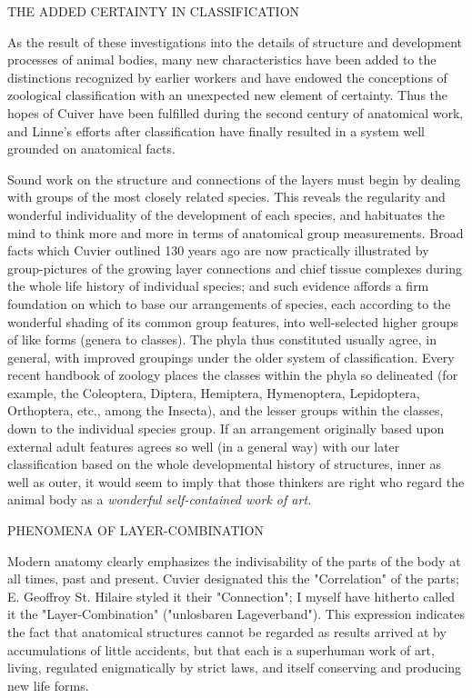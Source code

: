 THE ADDED CERTAINTY IN CLASSIFICATION

As the result of these investigations into the details of structure and development processes of
animal bodies, many new characteristics have been added to the distinctions recognized by
earlier workers and have endowed the conceptions of zoological classification with an
unexpected new element of certainty. Thus the hopes of Cuiver have been fulfilled during the
second century of anatomical work, and Linne's efforts after classification have finally
resulted in a system well grounded on anatomical facts.

Sound work on the structure and connections of the layers must begin by dealing with groups
of the most closely related species. This reveals the regularity and wonderful individuality of
the development of each species, and habituates the mind to think more and more in terms of
anatomical group measurements. Broad facts which Cuvier outlined 130 years ago are now
practically illustrated by group-pictures of the growing layer connections and chief tissue
complexes during the whole life history of individual species; and such evidence affords a
firm foundation on which to base our arrangements of species, each according to the
wonderful shading of its common group features, into well-selected higher groups of like
forms (genera to classes). The phyla thus constituted usually agree, in general, with improved
groupings under the older system of classification. Every recent handbook of zoology places
the classes within the phyla so delineated (for example, the Coleoptera, Diptera, Hemiptera,
Hymenoptera, Lepidoptera, Orthoptera, etc., among the Insecta), and the lesser groups within
the classes, down to the individual species group. If an arrangement originally based upon
external adult features agrees so well (in a general way) with our later classification based on
the whole developmental history of structures, inner as well as outer, it would seem to imply
that those thinkers are right who regard the animal body as a \textit{wonderful self-contained work
of art.}

PHENOMENA OF LAYER-COMBINATION

Modern anatomy clearly emphasizes the indivisability of the parts of the body at all times,
past and present. Cuvier designated this the "Correlation" of the parts; E. Geoffroy St. Hilaire
styled it their "Connection"; I myself have hitherto called it the "Layer-Combination"
("unlosbaren Lageverband"). This expression indicates the fact that anatomical structures
cannot be regarded as results arrived at by accumulations of little accidents, but that each is a
superhuman work of art, living, regulated enigmatically by strict laws, and itself conserving
and producing new life forms.

